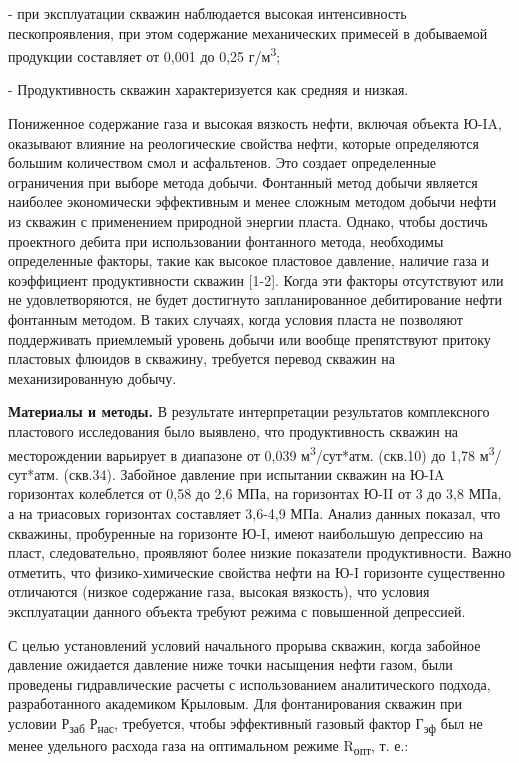 \begin{multicols}{2}
- при эксплуатации скважин наблюдается высокая интенсивность
пескопроявления, при этом содержание механических примесей в
добываемой продукции составляет от 0,001 до 0,25
г/м\textsuperscript{3};

- Продуктивность скважин характеризуется как средняя и низкая.

Пониженное содержание газа и высокая вязкость нефти, включая объекта
Ю-IA, оказывают влияние на реологические свойства нефти, которые
определяются большим количеством смол и асфальтенов. Это создает
определенные ограничения при выборе метода добычи. Фонтанный метод
добычи является наиболее экономически эффективным и менее сложным
методом добычи нефти из скважин с применением природной энергии пласта.
Однако, чтобы достичь проектного дебита при использовании фонтанного
метода, необходимы определенные факторы, такие как высокое пластовое
давление, наличие газа и коэффициент продуктивности скважин {[}1-2{]}.
Когда эти факторы отсутствуют или не удовлетворяются, не будет
достигнуто запланированное дебитирование нефти фонтанным методом. В
таких случаях, когда условия пласта не позволяют поддерживать приемлемый
уровень добычи или вообще препятствуют притоку пластовых флюидов в
скважину, требуется перевод скважин на механизированную добычу.

{\bfseries Материалы и методы.} В результате интерпретации результатов
комплексного пластового исследования было выявлено, что продуктивность
скважин на месторождении варьирует в диапазоне от 0,039
м\textsuperscript{3}/сут*атм. (скв.10) до 1,78
м\textsuperscript{3}/сут*атм. (скв.34). Забойное давление при испытании
скважин на Ю-IA горизонтах колеблется от 0,58 до 2,6 МПа, на горизонтах
Ю-II от 3 до 3,8 МПа, а на триасовых горизонтах составляет 3,6-4,9 МПа.
Анализ данных показал, что скважины, пробуренные на горизонте Ю-I, имеют
наибольшую депрессию на пласт, следовательно, проявляют более низкие
показатели продуктивности. Важно отметить, что физико-химические
свойства нефти на Ю-I горизонте существенно отличаются (низкое
содержание газа, высокая вязкость), что условия эксплуатации данного
объекта требуют режима с повышенной депрессией.

С целью установлений условий начального прорыва скважин, когда забойное
давление ожидается давление ниже точки насыщения нефти газом, были
проведены гидравлические расчеты с использованием аналитического
подхода, разработанного академиком Крыловым. Для фонтанирования скважин
при условии Р\textsubscript{заб}  Р\textsubscript{нас},
требуется, чтобы эффективный газовый фактор Г\textsubscript{эф} был не
менее удельного расхода газа на оптимальном режиме R\textsubscript{опт},
т. е.:


\end{multicols}
